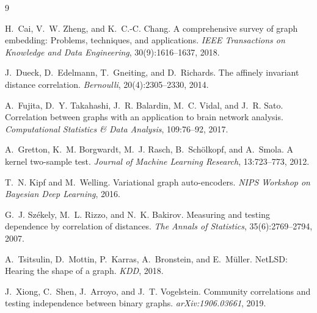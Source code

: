 \documentclass[11pt]{article}
\begin{document}

\begin{thebibliography}{9}

H.~Cai, V.~W. Zheng, and K.~C.-C. Chang.
\newblock A comprehensive survey of graph embedding: Problems, techniques, and
  applications.
\newblock \emph{IEEE Transactions on Knowledge and Data Engineering},
  30(9):1616--1637, 2018.

J.~Dueck, D.~Edelmann, T.~Gneiting, and D.~Richards.
\newblock The affinely invariant distance correlation.
\newblock \emph{Bernoulli}, 20(4):2305--2330, 2014.

A.~Fujita, D.~Y. Takahashi, J.~R. Balardin, M.~C. Vidal, and J.~R. Sato.
\newblock Correlation between graphs with an application to brain network
  analysis.
\newblock \emph{Computational Statistics \& Data Analysis}, 109:76--92, 2017.

A.~Gretton, K.~M. Borgwardt, M.~J. Rasch, B.~Sch\"olkopf, and A.~Smola.
\newblock A kernel two-sample test.
\newblock \emph{Journal of Machine Learning Research}, 13:723--773, 2012.

T.~N. Kipf and M.~Welling.
\newblock Variational graph auto-encoders.
\newblock \emph{NIPS Workshop on Bayesian Deep Learning}, 2016.

G.~J. Sz\'ekely, M.~L. Rizzo, and N.~K. Bakirov.
\newblock Measuring and testing dependence by correlation of distances.
\newblock \emph{The Annals of Statistics}, 35(6):2769--2794, 2007.

A.~Tsitsulin, D.~Mottin, P.~Karras, A.~Bronstein, and E.~M\"uller.
\newblock NetLSD: Hearing the shape of a graph.
\newblock \emph{KDD}, 2018.

J.~Xiong, C.~Shen, J.~Arroyo, and J.~T. Vogelstein.
\newblock Community correlations and testing independence between binary
  graphs.
\newblock \emph{arXiv:1906.03661}, 2019.

\end{thebibliography}
\end{document}
